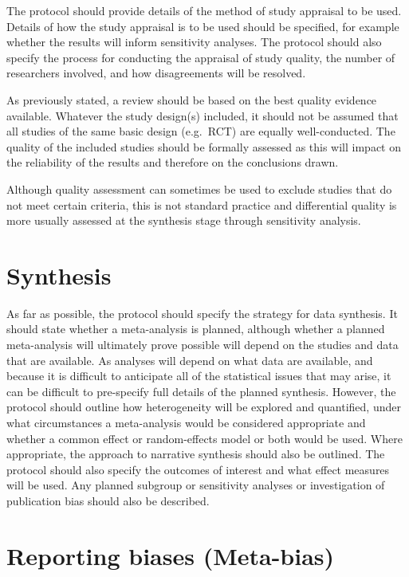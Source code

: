 \documentclass[
  10pt,
  a4paper,
  DIV=11,
  numbers=noendperiod]{scrreprt}
\begin{document}
The protocol should provide details of the method of study appraisal to
be used. Details of how the study appraisal is to be used should be
specified, for example whether the results will inform sensitivity
analyses. The protocol should also specify the process for conducting
the appraisal of study quality, the number of researchers involved, and
how disagreements will be resolved.

As previously stated, a review should be based on the best quality
evidence available. Whatever the study design(s) included, it should not
be assumed that all studies of the same basic design (e.g.~RCT) are
equally well-conducted. The quality of the included studies should be
formally assessed as this will impact on the reliability of the results
and therefore on the conclusions drawn.

Although quality assessment can sometimes be used to exclude studies
that do not meet certain criteria, this is not standard practice and
differential quality is more usually assessed at the synthesis stage
through sensitivity analysis.

\section{Synthesis}\label{synthesis}

As far as possible, the protocol should specify the strategy for data
synthesis. It should state whether a meta-analysis is planned, although
whether a planned meta-analysis will ultimately prove possible will
depend on the studies and data that are available. As analyses will
depend on what data are available, and because it is difficult to
anticipate all of the statistical issues that may arise, it can be
difficult to pre-specify full details of the planned synthesis. However,
the protocol should outline how heterogeneity will be explored and
quantified, under what circumstances a meta-analysis would be considered
appropriate and whether a common effect or random-effects model or both
would be used. Where appropriate, the approach to narrative synthesis
should also be outlined. The protocol should also specify the outcomes
of interest and what effect measures will be used. Any planned subgroup
or sensitivity analyses or investigation of publication bias should also
be described.

\section{Reporting biases (Meta-bias)}\label{reporting-biases-meta-bias}
\end{document}
